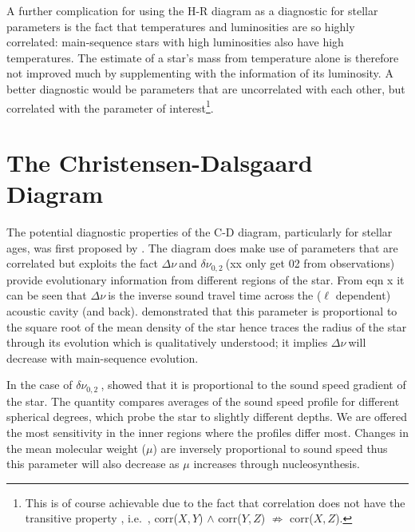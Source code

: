 \documentclass[a4paper,fleqn,usenatbib,useAMS]{mnras}
\newcommand{\Dnu}{\ensuremath{\Delta\nu \ }}
\newcommand{\dnu}{\ensuremath{\delta\nu_{0,2} \ }}
\begin{document}
A further complication for using the H-R diagram as a diagnostic for stellar parameters is the fact that temperatures and luminosities are so highly correlated: main-sequence stars with high luminosities also have high temperatures. The estimate of a star's mass from temperature alone is therefore not improved much by supplementing with the information of its luminosity. A better diagnostic would be parameters that are uncorrelated with each other, but correlated with the parameter of interest\footnote{This is of course achievable due to the fact that correlation does not have the transitive property \citep[see e.g.][]{10.2307/2685695}, i.e.~, corr($X,Y$) $\wedge$ corr($Y,Z$) $\not \Rightarrow$ corr($X,Z$).}. %


\section{The Christensen-Dalsgaard Diagram} %
The potential diagnostic properties of the C-D diagram, particularly for stellar ages, was first proposed by \citet{1984srps.conf...11C}. The diagram does make use of parameters that are correlated but exploits the fact \Dnu and \dnu (xx only get 02 from observations) provide evolutionary information from different regions of the star. From eqn x it can be seen that \Dnu is the inverse sound travel time across the ($\ell$ dependent) acoustic cavity (and back).  
\citet{1986ApJ...306L..37U} demonstrated that this parameter is proportional to the square root of the mean density of the star hence traces the radius of the star through its evolution which is qualitatively understood; it implies \Dnu will decrease with main-sequence evolution. 


In the case of \dnu, \citet{1986HiA.....7..283G} showed that it is proportional to the sound speed gradient of the star. The quantity compares averages of the sound speed profile for different spherical degrees, which probe the star to slightly different depths. We are offered the most sensitivity in the inner regions where the profiles differ most. Changes in the mean molecular weight ($\mu$) are inversely proportional to sound speed thus this parameter will also decrease as $\mu$ increases through nucleosynthesis. 
\end{document}
